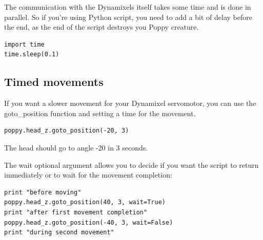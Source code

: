 \documentclass{article}
\begin{document}
 The communication with the Dynamixels itself takes some time and is done in parallel. So if you're using Python script, you need to add a bit of delay before the end, as the end of the script destroys you Poppy creature.
 
 \begin{verbatim}
import time
time.sleep(0.1)
\end{verbatim}

\subsection{Timed movements}

If you want a slower movement for your Dynamixel servomotor, you can use the goto\_position function and setting a time for the movement. 

\begin{verbatim}
poppy.head_z.goto_position(-20, 3)
\end{verbatim}

The head should go to angle -20 in 3 seconds.

The wait optional argument allows you to decide if you want the script to return immediately or to wait for the movement completion:

\begin{verbatim}
print "before moving"
poppy.head_z.goto_position(40, 3, wait=True)
print "after first movement completion"
poppy.head_z.goto_position(-40, 3, wait=False)
print "during second movement"
\end{verbatim}




%
%
%
%
%

\end{document}
